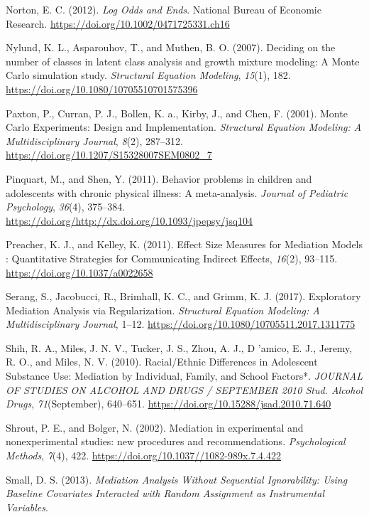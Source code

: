 \documentclass[]{DissertateUSU}
\begin{document}
\hypertarget{ref-Norton2012}{}
Norton, E. C. (2012). \emph{Log Odds and Ends}. National Bureau of
Economic Research. \url{https://doi.org/10.1002/0471725331.ch16}

\hypertarget{ref-Nylund2007}{}
Nylund, K. L., Asparouhov, T., and Muthen, B. O. (2007). Deciding on the
number of classes in latent class analysis and growth mixture modeling:
A Monte Carlo simulation study. \emph{Structural Equation Modeling},
\emph{15}(1), 182. \url{https://doi.org/10.1080/10705510701575396}

\hypertarget{ref-Paxton2001}{}
Paxton, P., Curran, P. J., Bollen, K. a., Kirby, J., and Chen, F.
(2001). Monte Carlo Experiments: Design and Implementation.
\emph{Structural Equation Modeling: A Multidisciplinary Journal},
\emph{8}(2), 287--312. \url{https://doi.org/10.1207/S15328007SEM0802_7}

\hypertarget{ref-Pinquart2011}{}
Pinquart, M., and Shen, Y. (2011). Behavior problems in children and
adolescents with chronic physical illness: A meta-analysis.
\emph{Journal of Pediatric Psychology}, \emph{36}(4), 375--384.
\url{https://doi.org/http://dx.doi.org/10.1093/jpepsy/jsq104}

\hypertarget{ref-Preacher2011}{}
Preacher, K. J., and Kelley, K. (2011). Effect Size Measures for
Mediation Models : Quantitative Strategies for Communicating Indirect
Effects, \emph{16}(2), 93--115. \url{https://doi.org/10.1037/a0022658}

\hypertarget{ref-Serang2017}{}
Serang, S., Jacobucci, R., Brimhall, K. C., and Grimm, K. J. (2017).
Exploratory Mediation Analysis via Regularization. \emph{Structural
Equation Modeling: A Multidisciplinary Journal}, 1--12.
\url{https://doi.org/10.1080/10705511.2017.1311775}

\hypertarget{ref-Shih2010}{}
Shih, R. A., Miles, J. N. V., Tucker, J. S., Zhou, A. J., D 'amico, E.
J., Jeremy, R. O., and Miles, N. V. (2010). Racial/Ethnic Differences in
Adolescent Substance Use: Mediation by Individual, Family, and School
Factors*. \emph{JOURNAL OF STUDIES ON ALCOHOL AND DRUGS / SEPTEMBER 2010
Stud. Alcohol Drugs}, \emph{71}(September), 640--651.
\url{https://doi.org/10.15288/jsad.2010.71.640}

\hypertarget{ref-Shrout2002}{}
Shrout, P. E., and Bolger, N. (2002). Mediation in experimental and
nonexperimental studies: new procedures and recommendations.
\emph{Psychological Methods}, \emph{7}(4), 422.
\url{https://doi.org/10.1037//1082-989x.7.4.422}

\hypertarget{ref-Small2013}{}
Small, D. S. (2013). \emph{Mediation Analysis Without Sequential
Ignorability: Using Baseline Covariates Interacted with Random
Assignment as Instrumental Variables}.
\end{document}
